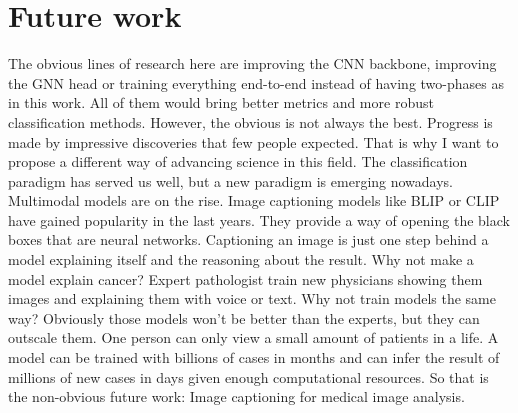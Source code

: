 \chapter{Future work}

The obvious lines of research here are improving the CNN backbone, improving the GNN head or training everything end-to-end instead of having two-phases as in this work. All of them would bring better metrics and more robust classification methods. However, the obvious is not always the best. Progress is made by impressive discoveries that few people expected. That is why I want to propose a different way of advancing science in this field. The classification paradigm has served us well, but a new paradigm is emerging nowadays. Multimodal models are on the rise. Image captioning models like BLIP \cite{li2022blip} or CLIP \cite{radford2021learning} have gained popularity in the last years. They provide a way of opening the black boxes that are neural networks. Captioning an image is just one step behind a model explaining itself and the reasoning about the result. Why not make a model explain cancer? Expert pathologist train new physicians showing them images and explaining them with voice or text. Why not train models the same way? Obviously those models won't be better than the experts, but they can outscale them. One person can only view a small amount of patients in a life. A model can be trained with billions of cases in months and can infer the result of millions of new cases in days given enough computational resources. So that is the non-obvious future work: Image captioning for medical image analysis.

